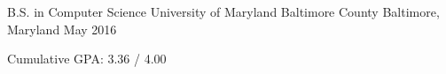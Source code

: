 

\begin{cventries}

  \cventry
    {B.S. in Computer Science} %
    {University of Maryland Baltimore County} %
    {Baltimore, Maryland} %
    {May 2016} %
    {
      \begin{cvitems} %
        \item {Cumulative GPA: 3.36 / 4.00}
      \end{cvitems}
	}

\end{cventries}
